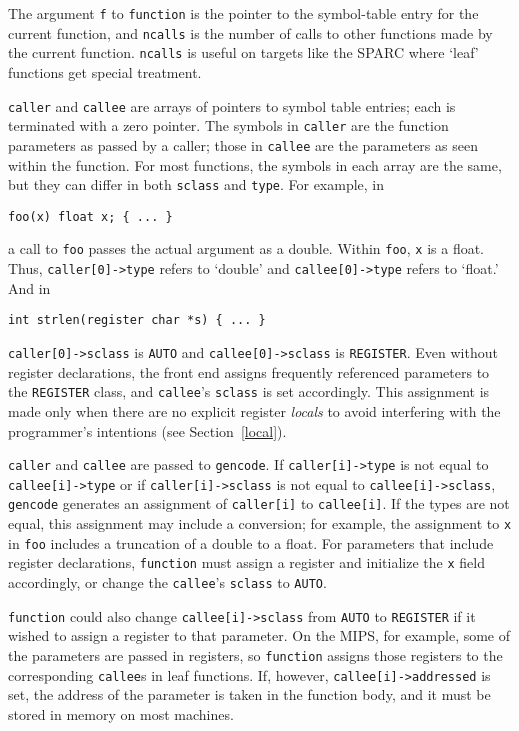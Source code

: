 The argument \verb|f| to \verb|function| is the pointer
to the symbol-table entry for the current function,
and \verb|ncalls| is the number of calls to other functions
made by the current function. \verb|ncalls| is useful
on targets like the SPARC where `leaf' functions get special treatment.

\verb|caller| and \verb|callee| are arrays of pointers to symbol
table entries; each is terminated with a zero pointer.
The symbols in \verb|caller| are the function parameters
as passed by a caller; those in \verb|callee| are the parameters
as seen within the function. For most functions,
the symbols in each array are the same, but they
can differ in both \verb|sclass| and \verb|type|.
For example, in
\begin{verbatim}
foo(x) float x; { ... }
\end{verbatim}
a call to \verb|foo| passes the actual argument as a double.
Within \verb|foo|, \verb|x| is a float.
Thus, \verb|caller[0]->type| refers to `double' and \verb|callee[0]->type|
refers to `float.' And in
\begin{verbatim}
int strlen(register char *s) { ... }
\end{verbatim}
\verb|caller[0]->sclass| is \verb|AUTO| and \verb|callee[0]->sclass| is \verb|REGISTER|.
Even without register declarations, the front end assigns
frequently referenced parameters to the \verb|REGISTER| class,
and \verb|callee|'s \verb|sclass| is set accordingly.
This assignment is made only when there are no explicit register {\em locals}
to avoid interfering with the programmer's intentions (see Section~\ref{local}).

\verb|caller| and \verb|callee| are passed to \verb|gencode|.
If \verb|caller[i]->type| is not equal to \verb|callee[i]->type|
or if \verb|caller[i]->sclass| is not equal to \verb|callee[i]->sclass|,
\verb|gencode| generates an assignment of \verb|caller[i]|
to \verb|callee[i]|. If the types are not equal, this assignment
may include a conversion; for example, the assignment to \verb|x| in
\verb|foo| includes a truncation of a double to a float.
For parameters that include register declarations, \verb|function|
must assign a register and initialize the \verb|x| field accordingly,
or change the \verb|callee|'s \verb|sclass| to \verb|AUTO|.

\verb|function| could also change \verb|callee[i]->sclass| from \verb|AUTO|
to \verb|REGISTER| if it wished to assign a register to that parameter.
On the MIPS, for example, some of the parameters are passed in registers,
so \verb|function| assigns those registers to the corresponding
\verb|callee|s in leaf functions. If, however, \verb|callee[i]->addressed| is set,
the address of the parameter is taken in the function body,
and it must be stored in memory on most machines.

